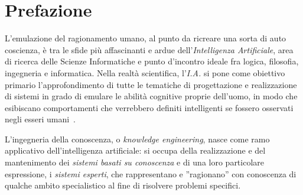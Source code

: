 \chapter*{Prefazione}
\rhead{}

L'emulazione del ragionamento umano, al punto da ricreare una sorta di auto coscienza, è tra le sfide più affascinanti e ardue dell'\emph{Intelligenza Artificiale}, area di ricerca delle Scienze Informatiche e punto d'incontro ideale fra logica, filosofia, ingegneria e informatica. Nella realtà scientifica, l'\emph{I.A.} si pone come obiettivo primario l'approfondimento di tutte le tematiche di progettazione e realizzazione di sistemi in grado di emulare le abilità cognitive proprie dell'uomo, in modo che esibiscano comportamenti che verrebbero definiti intelligenti se fossero osservati negli esseri umani~\cite{feigenbaum1995computers}. 

L'ingegneria della conoscenza, o \emph{knowledge engineering}, nasce come ramo applicativo dell'intelligenza artificiale: si occupa della realizzazione e del mantenimento dei \emph{sistemi basati su conoscenza} e di una loro particolare espressione, i \emph{sistemi esperti}, che rappresentano e ''ragionano'' con conoscenza di qualche ambito specialistico al fine di risolvere problemi specifici.

